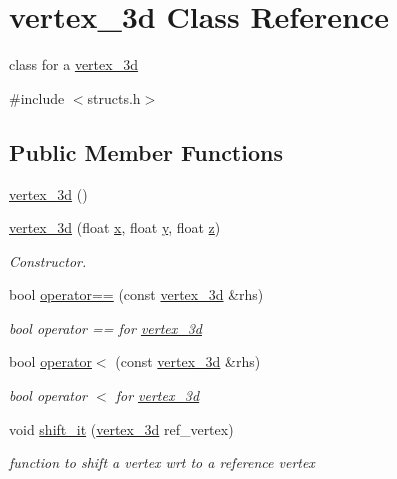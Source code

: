 \hypertarget{classvertex__3d}{}\section{vertex\+\_\+3d Class Reference}
\label{classvertex__3d}


class for a \hyperlink{classvertex__3d}{vertex\+\_\+3d}  




{\ttfamily \#include $<$structs.\+h$>$}

\subsection*{Public Member Functions}
\begin{DoxyCompactItemize}
\item 
\hyperlink{classvertex__3d_ae0630ed7fe90fcd6db3ea358e810def9}{vertex\+\_\+3d} ()
\item 
\hyperlink{classvertex__3d_aeebc5aa93fe7dfd5d51f98b773510120}{vertex\+\_\+3d} (float \hyperlink{classvertex__3d_a3f42c81ecbe6cab86cda63854c7799c8}{x}, float \hyperlink{classvertex__3d_a44d8a3570860630dc76bfa0817786a9b}{y}, float \hyperlink{classvertex__3d_a9028d1e6317552f63d6cbd57ff5a42ba}{z})
\begin{DoxyCompactList}\small\item\em Constructor. \end{DoxyCompactList}\item 
bool \hyperlink{classvertex__3d_a0ac2c7800ee046ea93f1f8525bcf73f2}{operator==} (const \hyperlink{classvertex__3d}{vertex\+\_\+3d} \&rhs)
\begin{DoxyCompactList}\small\item\em bool operator == for \hyperlink{classvertex__3d}{vertex\+\_\+3d} \end{DoxyCompactList}\item 
bool \hyperlink{classvertex__3d_a9d8ac0e85adeaa7b47de5adee8f1cccb}{operator$<$} (const \hyperlink{classvertex__3d}{vertex\+\_\+3d} \&rhs)
\begin{DoxyCompactList}\small\item\em bool operator $<$ for \hyperlink{classvertex__3d}{vertex\+\_\+3d} \end{DoxyCompactList}\item 
void \hyperlink{classvertex__3d_ab3b7d3a3201f4d9a4da75b5b1c379ac1}{shift\+\_\+it} (\hyperlink{classvertex__3d}{vertex\+\_\+3d} ref\+\_\+vertex)
\begin{DoxyCompactList}\small\item\em function to shift a vertex wrt to a reference vertex \end{DoxyCompactList}\item 

\end{DoxyCompactItemize}
